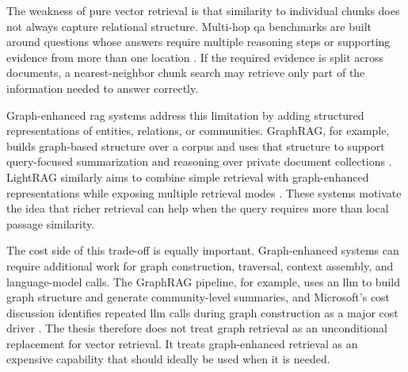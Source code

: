 \documentclass[english, bibtex]{kththesis}               %
\numberwithin{listing}{chapter}
\begin{document}
The weakness of pure vector retrieval is that similarity to individual chunks does not always capture relational structure. Multi-hop \gls{qa} benchmarks are built around questions whose answers require multiple reasoning steps or supporting evidence from more than one location \cite{yang2018hotpotqa,ho2020twowiki,trivedi2022musique}. If the required evidence is split across documents, a nearest-neighbor chunk search may retrieve only part of the information needed to answer correctly.

Graph-enhanced \gls{rag} systems address this limitation by adding structured representations of entities, relations, or communities. GraphRAG, for example, builds graph-based structure over a corpus and uses that structure to support query-focused summarization and reasoning over private document collections \cite{edge2024graphrag}. LightRAG similarly aims to combine simple retrieval with graph-enhanced representations while exposing multiple retrieval modes \cite{lightrag2024}. These systems motivate the idea that richer retrieval can help when the query requires more than local passage similarity.

The cost side of this trade-off is equally important. Graph-enhanced systems can require additional work for graph construction, traversal, context assembly, and language-model calls. The GraphRAG pipeline, for example, uses an \gls{llm} to build graph structure and generate community-level summaries, and Microsoft's cost discussion identifies repeated \gls{llm} calls during graph construction as a major cost driver \cite{edge2024graphrag,microsoft2024graphragcosts}. The thesis therefore does not treat graph retrieval as an unconditional replacement for vector retrieval. It treats graph-enhanced retrieval as an expensive capability that should ideally be used when it is needed.
\end{document}
